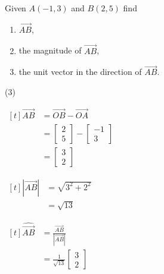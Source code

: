 \documentclass[11pt,a4paper]{book}
\begin{document}
\begin{example}

Given $A\left(-1,3\right)$ and $B\left(2,5\right)$ find

\begin{enumerate}[label=(\alph*)]

\item  $\overrightarrow{AB}$,

\item  the magnitude of $\overrightarrow{AB}$,

\item  the unit vector in the direction of $\overrightarrow{AB}$.

\end{enumerate}

\newpage

\Solution


\begin{tasks}[label=(\alph*),label-width=3.5ex](3)

\task
$
\begin{aligned}[t]
\overrightarrow{AB} & =\overrightarrow{OB}-\overrightarrow{OA}\\
 & =\begin{bmatrix}2\\
5
\end{bmatrix}-\begin{bmatrix}-1\\
3
\end{bmatrix}\\
 & =\begin{bmatrix}3\\
2
\end{bmatrix}
\end{aligned}
$

\task
$
\begin{aligned}[t]
\left|\overrightarrow{AB}\right| & =\sqrt{3^{2}+2^{2}}\\
 & =\sqrt{13}
\end{aligned}
$

\task
$
\begin{aligned}[t]
\widehat{\overrightarrow{AB}} & =\frac{\overrightarrow{AB}}{\left|\overrightarrow{AB}\right|}\\
 & =\frac{1}{\sqrt{13}}\begin{bmatrix}3\\
2
\end{bmatrix}
\end{aligned}
$

\end{tasks}


\end{example}
\end{document}
